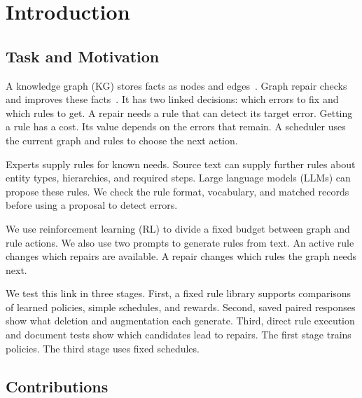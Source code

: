 \section{Introduction}

\label{sec:introduction}

\subsection{Task and Motivation}

A knowledge graph (KG) stores facts as nodes and edges~\cite{ref_ji2021}.
Graph repair checks and improves these facts~\cite{ref_paulheim2017}. It has
two linked decisions: which errors to fix and which rules to get. A repair
needs a rule that can detect its target error. Getting a rule has a cost.
Its value depends on the errors that remain. A scheduler uses the current
graph and rules to choose the next action.

Experts supply rules for known needs. Source text can supply further rules
about entity types, hierarchies, and required steps. Large language models
(LLMs) can propose these rules. We check the rule format, vocabulary, and
matched records before using a proposal to detect errors.

We use reinforcement learning (RL) to divide a fixed budget between graph
and rule actions. We also use two prompts to generate rules from text.
An active rule changes which repairs are available. A repair changes which
rules the graph needs next.

We test this link in three stages. First, a fixed rule library supports
comparisons of learned policies, simple schedules, and rewards. Second,
saved paired responses show what deletion and augmentation each generate.
Third, direct rule execution and document tests show which candidates
lead to repairs. The first stage trains policies. The third stage uses
fixed schedules.

\subsection{Contributions}

